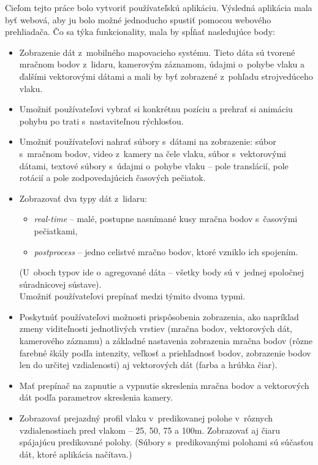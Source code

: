 Cieľom tejto práce bolo vytvoriť používateľskú aplikáciu. Výsledná aplikácia mala byť webová, aby ju bolo možné jednoducho spustiť pomocou webového prehliadača. Čo sa týka funkcionality, mala by spĺňať nasledujúce body:

\begin{itemize}
    \item Zobrazenie dát z~mobilného mapovacieho systému. Tieto dáta sú tvorené mračnom bodov z~lidaru, kamerovým záznamom, údajmi o~pohybe vlaku a ďalšími vektorovými dátami a mali by byť zobrazené z~pohľadu strojvedúceho vlaku.
    \item Umožniť používateľovi vybrať si konkrétnu pozíciu a prehrať si animáciu pohybu po trati s~nastaviteľnou rýchlosťou.
    \item Umožniť používateľovi nahrať súbory s~dátami na zobrazenie: súbor s~mračnom bodov, video z~kamery na čele vlaku, súbor s~vektorovými dátami, textové súbory s~údajmi o~pohybe vlaku -- pole translácií, pole rotácií a pole zodpovedajúcich časových pečiatok.
    \item Zobrazovať dva typy dát z~lidaru:
    \begin{itemize}
        \item \emph{real-time} -- malé, postupne nasnímané kusy mračna bodov s~časovými pečiatkami,
        \item \emph{postprocess} -- jedno celistvé mračno bodov, ktoré vzniklo ich spojením.
    \end{itemize}
    (U~oboch typov ide o~agregované dáta -- všetky body sú v~jednej spoločnej súradnicovej sústave). \\
    Umožniť používateľovi prepínať medzi týmito dvoma typmi.
    \item Poskytnúť používateľovi možnosti prispôsobenia zobrazenia, ako napríklad zmeny viditeľnosti jednotlivých vrstiev (mračna bodov, vektorových dát, kamerového záznamu) a základné nastavenia zobrazenia mračna bodov (rôzne farebné škály podľa intenzity, veľkosť a priehľadnosť bodov, zobrazenie bodov len do určitej vzdialenosti) aj vektorových dát (farba a hrúbka čiar).
    \item Mať prepínač na zapnutie a vypnutie skreslenia mračna bodov a vektorových dát podľa parametrov skreslenia kamery.
    \item Zobrazovať prejazdný profil vlaku v~predikovanej polohe v~rôznych vzdialenostiach pred vlakom -- 25, 50, 75 a 100m. Zobrazovať aj čiaru spájajúcu predikované polohy. (Súbory s~predikovanými polohami sú súčasťou dát, ktoré aplikácia načítava.)

\end{itemize}

